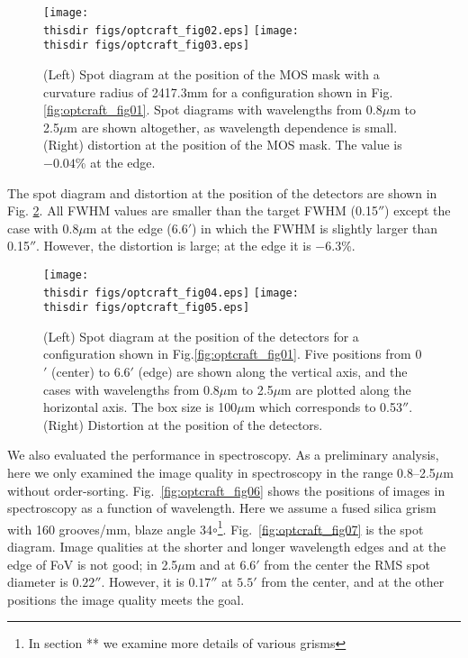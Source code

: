 \begin{figure}[!ht]
\centerline{
\texttt{[image: \\thisdir figs/optcraft\_fig02.eps]}
 \texttt{[image: \\thisdir figs/optcraft\_fig03.eps]}
}
\caption{(Left) Spot diagram at the position of the MOS mask with a
 curvature radius of 2417.3mm for a configuration shown in 
Fig.\ref{fig:optcraft_fig01}. Spot diagrams with wavelengths from
 0.8$\mu$m to 2.5$\mu$m are shown altogether, as wavelength dependence
 is small. (Right) distortion at the
 position of the MOS mask. The value is $-0.04$\% at the edge.
}
\label{fig:optcraft_fig02}
\end{figure}

The spot diagram and distortion at the position of the detectors are
shown in Fig. \ref{fig:optcraft_fig04}. All FWHM values are smaller than
the target FWHM (0.15$''$) except the case with 0.8$\mu$m
at the edge ($6.6'$) in which the FWHM is slightly larger than
0.15$''$. However, the distortion is large; at the edge it is 
$-6.3$\%.

\begin{figure}[!ht]
\centerline{
\texttt{[image: \\thisdir figs/optcraft\_fig04.eps]}
\texttt{[image: \\thisdir figs/optcraft\_fig05.eps]}
}
\caption{(Left) Spot diagram at the position of the detectors for a
 configuration shown in Fig.\ref{fig:optcraft_fig01}.
Five positions from 0$'$ (center) to 6.6$'$ (edge) are shown along the
 vertical axis, and the cases with wavelengths from 0.8$\mu$m to
 2.5$\mu$m are plotted along the horizontal axis. 
The box size is 100$\mu$m which corresponds to 0.53$''$.
(Right) Distortion at the position of the detectors.
}
\label{fig:optcraft_fig04}
\end{figure}


We also evaluated the performance in spectroscopy. As a preliminary
analysis, here we only examined the image quality in spectroscopy in the
range 0.8--2.5$\mu$m without order-sorting.
Fig.~\ref{fig:optcraft_fig06} shows the positions of images in
spectroscopy as a function of wavelength.
Here we assume a fused silica grism with 160 grooves/mm, blaze angle 
34$\circ$\footnote{In section ** we examine more details of various
grisms}.
Fig.~\ref{fig:optcraft_fig07} is the spot diagram. Image qualities at
the shorter and longer wavelength edges and at the edge of FoV is not
good; in 2.5$\mu$m and at $6.6'$ from the center the RMS spot diameter
is $0.22''$. However, it is $0.17''$ at $5.5'$ from the center, and
at the other positions the image quality meets the goal.

